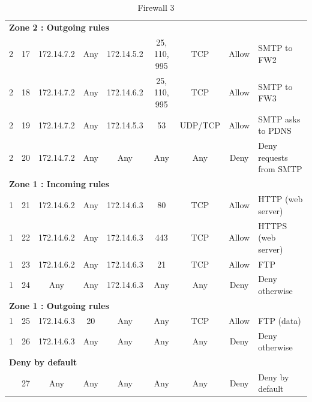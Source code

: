 \documentclass[a4paper,titlepage]{article}
\begin{document}
\begin{table}[h]
\begin{tabular}{c|c|cc|cc|ccl}
		\hline
		\multicolumn{9}{l}{\textbf{Zone 2 : Outgoing rules}}\\
		2 & 17 & 172.14.7.2 & Any & 172.14.5.2 & 25, 110, 995 & TCP & Allow & SMTP to FW2\\
		2 & 18 & 172.14.7.2 & Any & 172.14.6.2 & 25, 110, 995 & TCP & Allow & SMTP to FW3\\
		2 & 19 & 172.14.7.2 & Any & 172.14.5.3 & 53 & UDP/TCP & Allow & SMTP asks to PDNS \\
		2 & 20 & 172.14.7.2 & Any & Any & Any & Any & Deny & Deny requests from SMTP\\

		\hline
		\multicolumn{9}{l}{\textbf{Zone 1 : Incoming rules}}\\
		1 & 21 & 172.14.6.2 & Any & 172.14.6.3 & 80 & TCP & Allow & HTTP (web server)\\
		1 & 22 & 172.14.6.2 & Any & 172.14.6.3 & 443 & TCP & Allow & HTTPS (web server)\\
		1 & 23 & 172.14.6.2 & Any & 172.14.6.3 & 21 & TCP & Allow & FTP\\
		1 & 24 & Any & Any & 172.14.6.3 & Any & Any & Deny & Deny otherwise\\

		\hline
		\multicolumn{9}{l}{\textbf{Zone 1 : Outgoing rules}}\\
		1 & 25 & 172.14.6.3 & 20 & Any & Any & TCP & Allow & FTP (data)\\
		1 & 26 & 172.14.6.3 & Any & Any & Any & Any & Deny & Deny otherwise\\

		\hline
		\multicolumn{9}{l}{\textbf{Deny by default}}\\
		  & 27 & Any & Any & Any & Any & Any & Deny & Deny by default\\
		\hline
	\end{tabular}
	\caption{Firewall 3}
\end{table}




\end{document}
